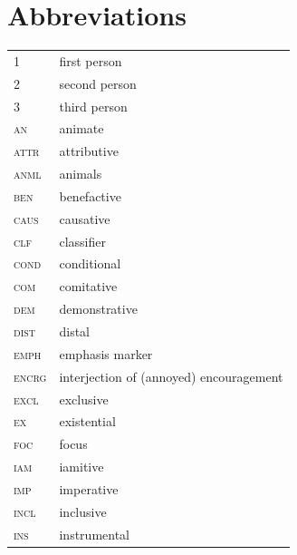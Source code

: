 \documentclass[output=paper,colorlinks,citecolor=brown,draft]{langscibook}
\begin{document}
\section*{Abbreviations}
\largerpage
\begin{tabularx}{.54\textwidth}{lQ}
1 & first person\\
2 & second person\\
3 & third person\\
\textsc{an} & animate\\
\textsc{attr} & attributive\\	
\textsc{anml} &  animals \\ 
\textsc{ben} & benefactive\\
\textsc{caus} & causative\\
\textsc{clf} & classifier\\
\textsc{cond} & conditional\\
\textsc{com} & comitative \\
\textsc{dem} & demonstrative\\
\textsc{dist} & distal\\
\textsc{emph} & emphasis marker \\
\textsc{encrg} & interjection of (annoyed) encouragement\\
\textsc{excl} & exclusive\\
\textsc{ex} & existential \\
\textsc{foc} & focus\\
\textsc{iam} & iamitive \\
\textsc{imp} & imperative\\
\textsc{incl} & inclusive\\
\textsc{ins} & instrumental\\
\end{tabularx}
\end{document}
